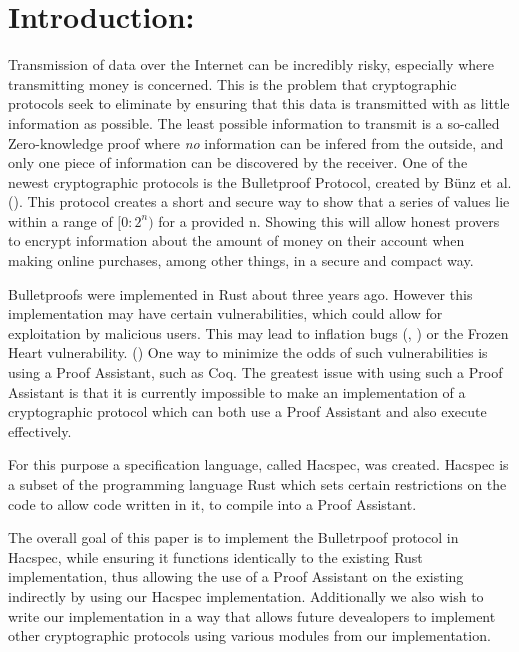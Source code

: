 \documentclass{article}
\begin{document}
\tableofcontents

\newpage


\section{Introduction:} \label{Introduction}

Transmission of data over the Internet can be incredibly risky, especially where transmitting money is concerned. This is the problem that cryptographic protocols seek to eliminate by ensuring that this data is transmitted with as little information as possible. The least possible information to transmit is a so-called Zero-knowledge proof where \textit{no} information can be infered from the outside, and only one piece of information can be discovered by the receiver. One of the newest cryptographic protocols is the Bulletproof Protocol, created by Bünz et al. (\cite{bulletproofs}). This protocol creates a short and secure way to show that a series of values lie within a range of $[0:2^n)$ for a provided n. Showing this will allow honest provers to encrypt information about the amount of money on their account when making online purchases, among other things, in a secure and compact way. 

Bulletproofs were implemented in Rust about three years ago. However this implementation may have certain vulnerabilities, which could allow for exploitation by malicious users. This may lead to inflation bugs (\cite{cryptonote}, \cite{z-cash}) or the Frozen Heart vulnerability. (\cite{frozen-heart}) One way to minimize the odds of such vulnerabilities is using a Proof Assistant, such as Coq. The greatest issue with using such a Proof Assistant is that it is currently impossible to make an implementation of a cryptographic protocol which can both use a Proof Assistant and also execute effectively. 

For this purpose a specification language, called Hacspec, was created. \cite{hacspec}Hacspec is a subset of the programming language Rust which sets certain restrictions on the code to allow code written in it, to compile into a Proof Assistant. %

The overall goal of this paper is to implement the Bulletrpoof protocol in Hacspec, while ensuring it functions identically to the existing Rust implementation, thus allowing the use of a Proof Assistant on the existing indirectly by using our Hacspec implementation. Additionally we also wish to write our implementation in a way that allows future devealopers to implement other cryptographic protocols using various modules from our implementation.
\end{document}
